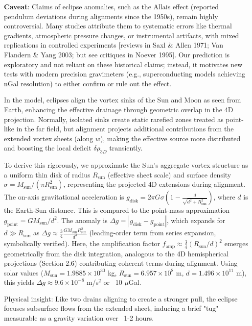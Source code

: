 \textbf{Caveat}: Claims of eclipse anomalies, such as the Allais effect (reported pendulum deviations during alignments since the 1950s), remain highly controversial. Many studies attribute them to systematic errors like thermal gradients, atmospheric pressure changes, or instrumental artifacts, with mixed replications in controlled experiments [reviews in Saxl \& Allen 1971; Van Flandern \& Yang 2003; but see critiques in Noever 1995]. Our prediction is exploratory and not reliant on these historical claims; instead, it motivates new tests with modern precision gravimeters (e.g., superconducting models achieving nGal resolution) to either confirm or rule out the effect.

In the model, eclipses align the vortex sinks of the Sun and Moon as seen from Earth, enhancing the effective drainage through geometric overlap in the 4D projection. Normally, isolated sinks create static rarefied zones treated as point-like in the far field, but alignment projects additional contributions from the extended vortex sheets (along $w$), making the effective source more distributed and boosting the local deficit $\delta \rho_{3D}$ transiently.

To derive this rigorously, we approximate the Sun's aggregate vortex structure as a uniform thin disk of radius $R_\text{sun}$ (effective sheet scale) and surface density $\sigma = M_\text{sun} / (\pi R_\text{sun}^2)$, representing the projected 4D extensions during alignment. The on-axis gravitational acceleration is $g_{\text{disk}} = 2 \pi G \sigma \left(1 - \frac{d}{\sqrt{d^2 + R_\text{sun}^2}}\right)$, where $d$ is the Earth-Sun distance. This is compared to the point-mass approximation $g_{\text{point}} = G M_\text{sun} / d^2$. The anomaly is $\Delta g = |g_{\text{disk}} - g_{\text{point}}|$, which expands for $d \gg R_\text{sun}$ as $\Delta g \approx \frac{3}{4} \frac{G M_\text{sun} R_\text{sun}^2}{d^4}$ (leading-order term from series expansion, symbolically verified). Here, the amplification factor $f_{\text{amp}} \approx \frac{3}{4} (R_\text{sun}/d)^2$ emerges geometrically from the disk integration, analogous to the 4D hemispherical projections (Section 2.6) contributing coherent terms during alignment. Using solar values ($M_\text{sun} = 1.9885 \times 10^{30}$ kg, $R_\text{sun} = 6.957 \times 10^8$ m, $d = 1.496 \times 10^{11}$ m), this yields $\Delta g \approx 9.6 \times 10^{-8}$ m/s$^2$ or ~10 $\mu$Gal.

Physical insight: Like two drains aligning to create a stronger pull, the eclipse focuses subsurface flows from the extended sheet, inducing a brief "tug" measurable as a gravity variation over ~1-2 hours.

